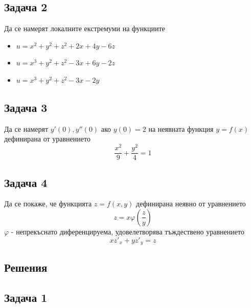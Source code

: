 \documentclass[a4paper,fleqn,12pt]{article}
\theoremstyle{definition}
\begin{document}
\subsection*{Задача 2}
Да се намерят локалните екстремуми на функциите
\begin{itemize}
\item $u = x^2 + y^2 + z^2 + 2x + 4y - 6z$
\item $u = x^3 + y^2 + z^2 - 3x + 6y - 2z$
\item $u = x^3 + y^2 + z^2 - 3x -2y$
\end{itemize}

\subsection*{Задача 3}
Да се намерят $y'(0), y''(0)$ ако $y(0) = 2$ на неявната функция $y = f(x)$ дефинирана от уравнението 
$$\frac{x^2}{9} + \frac{y^2}{4} = 1$$

\subsection*{Задача 4}
Да се покаже, че функцията $z = f(x,y)$ дефинирана неявно от уравнението 
$$z = x \varphi (\frac{z}{y})$$
$\varphi $ - непрекъснато диференцируема, удовелетворява тъждествено уравнението
$$xz'_x + yz'_y = z$$

\newpage
\subsection{Решения}
\subsection*{Задача 1}
\end{document}
